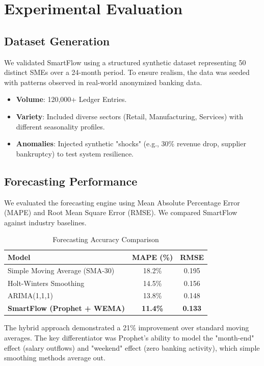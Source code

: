 \documentclass[conference]{IEEEtran}
\begin{document}
\section{Experimental Evaluation}

\subsection{Dataset Generation}
We validated SmartFlow using a structured synthetic dataset representing 50 distinct SMEs over a 24-month period. To ensure realism, the data was seeded with patterns observed in real-world anonymized banking data.
\begin{itemize}
    \item \textbf{Volume}: 120,000+ Ledger Entries.
    \item \textbf{Variety}: Included diverse sectors (Retail, Manufacturing, Services) with different seasonality profiles.
    \item \textbf{Anomalies}: Injected synthetic "shocks" (e.g., 30\% revenue drop, supplier bankruptcy) to test system resilience.
\end{itemize}

\subsection{Forecasting Performance}
We evaluated the forecasting engine using Mean Absolute Percentage Error (MAPE) and Root Mean Square Error (RMSE). We compared SmartFlow against industry baselines.

\begin{table}[h]
\centering
\caption{Forecasting Accuracy Comparison}
\begin{tabular}{lcc}
\toprule
\textbf{Model} & \textbf{MAPE (\%)} & \textbf{RMSE} \\
\midrule
Simple Moving Average (SMA-30) & 18.2\% & 0.195 \\
Holt-Winters Smoothing & 14.5\% & 0.156 \\
ARIMA(1,1,1) & 13.8\% & 0.148 \\
\textbf{SmartFlow (Prophet + WEMA)} & \textbf{11.4\%} & \textbf{0.133} \\
\bottomrule
\end{tabular}
\label{tab:forecast}
\end{table}

The hybrid approach demonstrated a 21\% improvement over standard moving averages. The key differentiator was Prophet's ability to model the "month-end" effect (salary outflows) and "weekend" effect (zero banking activity), which simple smoothing methods average out.
\end{document}
